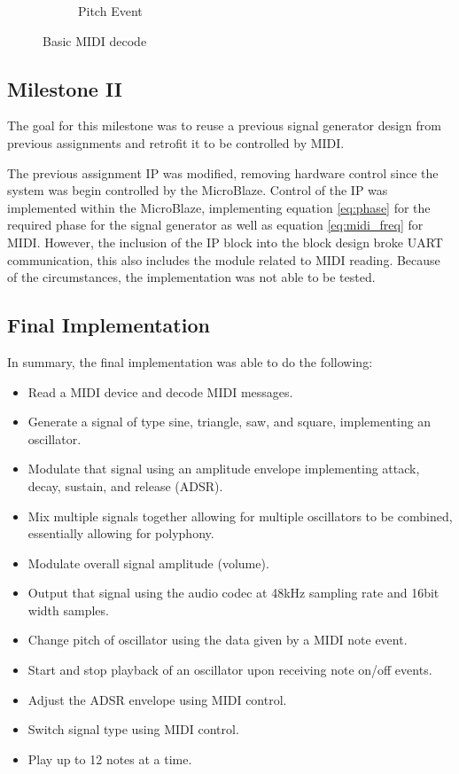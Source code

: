 \documentclass[12pt]{article}
\begin{document}
\begin{figure}[htb]
\begin{subfigure}{.5\textwidth}
        \caption{Pitch Event}
        \label{fig:decode_pitch}
    \end{subfigure}
    \caption{Basic MIDI decode}
    \label{fig:midi_decode}
\end{figure}

\subsection{Milestone II}

The goal for this milestone was to reuse a previous signal generator design from previous assignments and retrofit it to be controlled by MIDI.

The previous assignment IP was modified, removing hardware control since the system was begin controlled by the MicroBlaze. Control of the IP was implemented within the MicroBlaze, implementing equation \ref{eq:phase} for the required phase for the signal generator as well as equation \ref{eq:midi_freq} for MIDI. However, the inclusion of the IP block into the block design broke UART communication, this also includes the module related to MIDI reading. Because of the circumstances, the implementation was not able to be tested.

\subsection{Final Implementation}

In summary, the final implementation was able to do the following:

\begin{itemize}
    \item Read a MIDI device and decode MIDI messages.
    \item Generate a signal of type sine, triangle, saw, and square, implementing an oscillator.
    \item Modulate that signal using an amplitude envelope implementing attack, decay, sustain, and release (ADSR).
    \item Mix multiple signals together allowing for multiple oscillators to be combined, essentially allowing for polyphony.
    \item Modulate overall signal amplitude (volume).
    \item Output that signal using the audio codec at 48kHz sampling rate and 16bit width samples.
    \item Change pitch of oscillator using the data given by a MIDI note event.
    \item Start and stop playback of an oscillator upon receiving note on/off events.
    \item Adjust the ADSR envelope using MIDI control.
    \item Switch signal type using MIDI control.
    \item Play up to 12 notes at a time.
\end{itemize}
\end{document}
